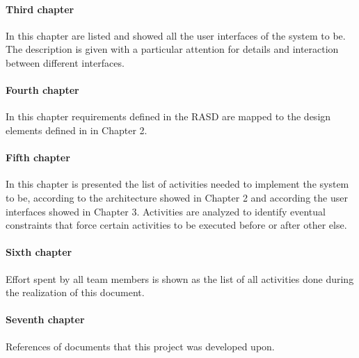 \documentclass[../DD.tex]{subfiles}
\begin{document}
		\paragraph{Third chapter}
			In this chapter are listed and showed all the user interfaces of the system to be. The description is given with a particular attention for details and interaction between different interfaces.
		\paragraph{Fourth chapter}
			In this chapter requirements defined in the RASD are mapped to the design elements defined in in Chapter 2.
		\paragraph{Fifth chapter}
			In this chapter is presented the list of activities needed to implement the system to be, according to the architecture showed in Chapter 2 and according the user interfaces showed in Chapter 3. Activities are analyzed to identify eventual constraints that force certain activities to be executed before or after other else. 
		\paragraph{Sixth chapter}
			Effort spent by all team members is shown as the list of all activities done during the realization of this document.
		\paragraph{Seventh chapter}
			References of documents that this project was developed upon.
		
\end{document}

